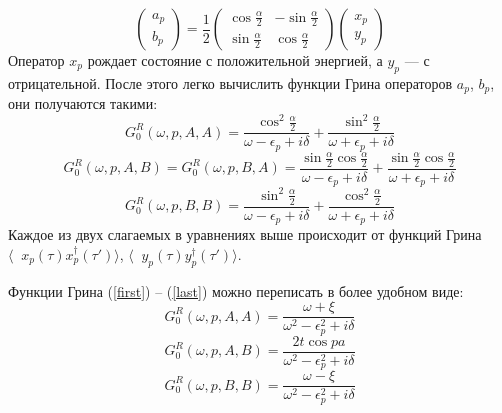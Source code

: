 \begin{equation}
	\left(
	\begin{matrix}
		a_p \\
		b_p
	\end{matrix}
	\right)
	=
	\frac12
	\left(
	\begin{matrix}
		\cos{\frac{\alpha}{2}} & -\sin{\frac{\alpha}{2}} \\
		\sin{\frac{\alpha}{2}} & \cos{\frac{\alpha}{2}}
	\end{matrix}
	\right)
	\left(
	\begin{matrix}
		x_p \\
		y_p
	\end{matrix}
	\right)
\end{equation}
Оператор $x_p$ рождает состояние с положительной энергией, а $y_p$ --- с отрицательной.
После этого легко вычислить функции Грина операторов $a_p$, $b_p$, они получаются такими:
\begin{equation}
	\label{first}
	G_0^R(\omega, p, A, A) = \frac{\cos^2{\frac{\alpha}{2}}}{\omega - \epsilon_p + i\delta}+
				\frac{\sin^2{\frac{\alpha}{2}}}{\omega + \epsilon_p + i\delta}
\end{equation}
\begin{equation}
	G_0^R(\omega, p, A, B) =  G_0^R(\omega, p, B, A)
			= \frac{\sin{\frac{\alpha}{2}}\cos{\frac{\alpha}{2}}}
					{\omega - \epsilon_p + i\delta}+
				\frac{\sin{\frac{\alpha}{2}}\cos{\frac{\alpha}{2}}}
					{\omega + \epsilon_p + i\delta}
\end{equation}
\begin{equation}
	\label{last}
	G_0^R(\omega, p, B, B) = \frac{\sin^2{\frac{\alpha}{2}}}{\omega - \epsilon_p + i\delta}+
				\frac{\cos^2{\frac{\alpha}{2}}}{\omega + \epsilon_p + i\delta}
\end{equation}
Каждое из двух слагаемых в уравнениях выше происходит от функций Грина 
$\langle \mathop{T_\tau} x_p(\tau) x_p^\dagger(\tau') \rangle$, 
$\langle \mathop{T_\tau} y_p(\tau) y_p^\dagger(\tau') \rangle$.

Функции Грина (\ref{first}) -- (\ref{last}) можно переписать в более удобном виде:
\begin{equation}
	G_0^R(\omega, p, A, A) = \frac{\omega + \xi}{\omega^2 - \epsilon_p^2 + i\delta}
\end{equation}
\begin{equation}
	G_0^R(\omega, p, A, B) = \frac{2t\cos{pa}}{\omega^2 - \epsilon_p^2 + i\delta}
\end{equation}
\begin{equation}
	G_0^R(\omega, p, B, B) = \frac{\omega - \xi}{\omega^2 - \epsilon_p^2 + i\delta}
\end{equation}
